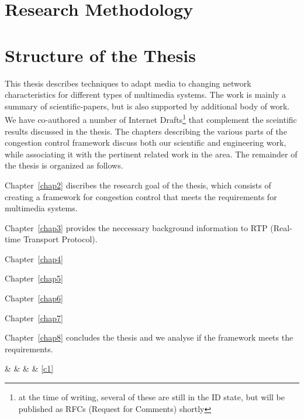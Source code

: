 

\section{Research Methodology}

\section{Structure of the Thesis}

This thesis describes techniques to adapt media to changing network
characteristics for different types of multimedia systems. The work is mainly
a summary of scientific-papers, but is also supported by additional body of
work. We have co-authored a number of Internet Drafts\footnote{at the time of
writing, several of these are still in the ID state, but will be published as
RFCs (Request for Comments) shortly} that complement the  sceintific results
discussed in the thesis. The chapters describing the various parts of the
congestion control framework discuss both our scientific and engineering work,
while associating it with the pertinent related work in the area. The
remainder of the thesis is organized as follows.

Chapter~\ref{chap2} discribes the research goal of the thesis, which consists
of creating a framework for congestion control that meets the  requirements
for multimedia systems.

Chapter~\ref{chap3} provides the neccessary background information to RTP
(Real-time Transport Protocol).

Chapter~\ref{chap4}

Chapter~\ref{chap5}

Chapter~\ref{chap6}

Chapter~\ref{chap7}

Chapter~\ref{chap8} concludes the thesis and we analyse if the framework meets
the requirements.





 \&  \&   \& \pageref{c1} \& \ref{c1} 




